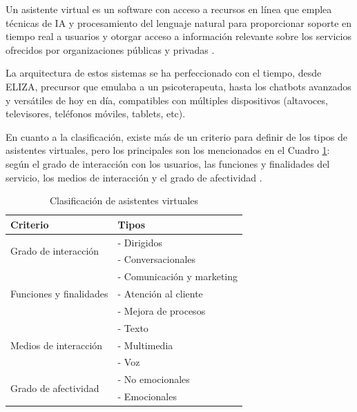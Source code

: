 Un asistente virtual es un software con acceso a recursos en línea que emplea técnicas de IA y procesamiento del lenguaje natural para proporcionar soporte en tiempo real a usuarios y otorgar acceso a información relevante sobre los servicios ofrecidos por organizaciones públicas y privadas \parencite{tfgAlexa1}.

La arquitectura de estos sistemas se ha perfeccionado con el tiempo, desde ELIZA, precursor que emulaba a un psicoterapeuta, hasta los chatbots avanzados y versátiles de hoy en día, compatibles con múltiples dispositivos (altavoces, televisores, teléfonos móviles, tablets, etc).

En cuanto a la clasificación, existe más de un criterio para definir de los tipos de asistentes virtuales, pero los principales son los mencionados en el Cuadro \ref{tab:criterios_asistentes_virtuales}: según el grado de interacción con los usuarios, las funciones y finalidades del servicio, los medios de interacción y el grado de afectividad \parencite{asistentesConv}.

\begin{table}[H]
    \centering
    \begin{tabular}{|l|l|}
    \hline
    \rowcolor{lightgray}
    \textbf{Criterio} & \textbf{Tipos} \\
    \hline
    \multirow{2}{*}{Grado de interacción} & - Dirigidos \\
     & - Conversacionales \\
    \hline
    \multirow{3}{*}{Funciones y finalidades} & - Comunicación y marketing \\
     & - Atención al cliente \\
     & - Mejora de procesos \\
    \hline
    \multirow{3}{*}{Medios de interacción} & - Texto \\
     & - Multimedia \\
     & - Voz \\
    \hline
    \multirow{2}{*}{Grado de afectividad} & - No emocionales \\
     & - Emocionales \\
    \hline
    \end{tabular}
    \caption{Clasificación de asistentes virtuales}
    \label{tab:criterios_asistentes_virtuales}
\end{table}

